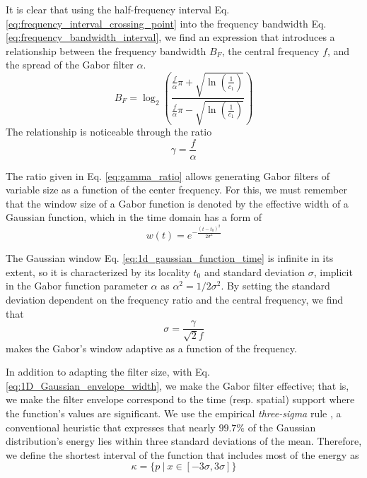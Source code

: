 \documentclass[journal]{IEEEtran}
\begin{document}
It is clear that using the half-frequency interval Eq. \eqref{eq:frequency_interval_crossing_point} into the frequency bandwidth Eq. \eqref{eq:frequency_bandwidth_interval}, we find an expression that introduces a relationship between the frequency bandwidth $B_F$, the central frequency $f$, and the spread of the Gabor filter $\alpha$.
\begin{equation}\label{eq:frequency_bandwidth}
    B_F = \log_2 \left( \frac{ \frac{f}{\alpha} \pi + \sqrt{\ln \left(\frac{1}{c_1}\right)} }{ \frac{f}{\alpha} \pi - \sqrt{\ln \left(\frac{1}{c_1}\right)} } \right)
\end{equation}
The relationship is noticeable through the ratio 
\begin{equation}\label{eq:gamma_ratio}
    \gamma = \frac{f}{\alpha}
\end{equation}

The ratio given in Eq. \ref{eq:gamma_ratio} allows generating Gabor filters of variable size as a function of the center frequency. For this, we must remember that the window size of a Gabor function is denoted by the effective width of a Gaussian function, which in the time domain has a form of
\begin{equation}\label{eq:1d_gaussian_function_time}
    w(t)=e^{-\frac{(t-t_0)^2}{2\sigma^2}}
\end{equation}

The Gaussian window Eq. \ref{eq:1d_gaussian_function_time} is infinite in its extent, so it is characterized by its locality $t_0$ and standard deviation $\sigma$, implicit in the Gabor function parameter $\alpha$ as $\alpha^2 = 1 / 2 \sigma^2$. By setting the standard deviation dependent on the frequency ratio and the central frequency, we find that
\begin{equation}
	\sigma = \frac{\gamma}{\sqrt{2}f} \label{eq:1D_Gaussian_envelope_width}
\end{equation} 
makes the Gabor's window adaptive as a function of the frequency.

In addition to adapting the filter size, with Eq. \eqref{eq:1D_Gaussian_envelope_width}, we make the Gabor filter effective; that is, we make the filter envelope correspond to the time (resp. spatial) support where the function's values are significant. We use the empirical \textit{three-sigma} rule \cite{Pukelsheim:AMSTAT:1994}, a conventional heuristic that expresses that nearly $99.7\%$ of the Gaussian distribution's energy lies within three standard deviations of the mean. Therefore, we define the shortest interval of the function that includes most of the energy as 
\begin{equation}
	\kappa = \lbrace p ~|~ x \in [-3\sigma, 3\sigma] \rbrace \label{eq:1D_gabor_support}
\end{equation}
\end{document}
